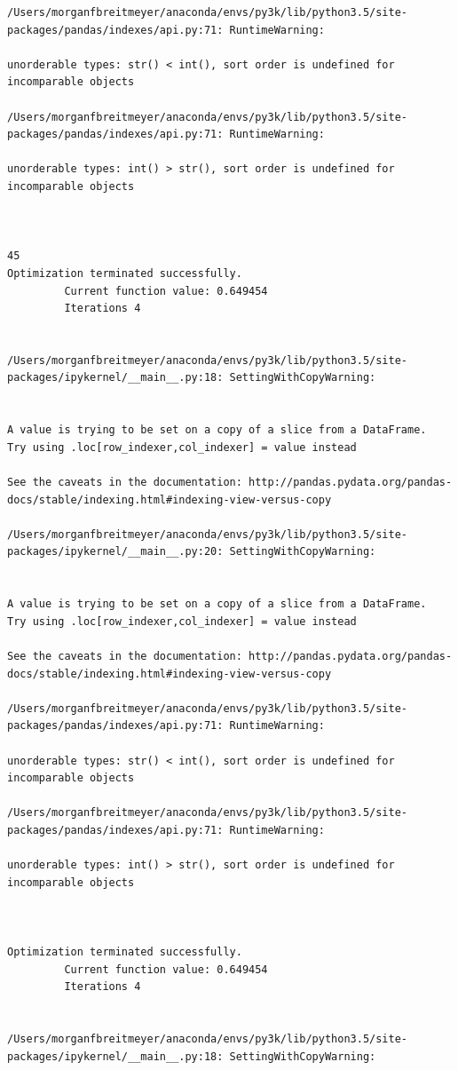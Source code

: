 \begin{lstlisting}
/Users/morganfbreitmeyer/anaconda/envs/py3k/lib/python3.5/site-packages/pandas/indexes/api.py:71: RuntimeWarning:

unorderable types: str() < int(), sort order is undefined for incomparable objects

/Users/morganfbreitmeyer/anaconda/envs/py3k/lib/python3.5/site-packages/pandas/indexes/api.py:71: RuntimeWarning:

unorderable types: int() > str(), sort order is undefined for incomparable objects



45
Optimization terminated successfully.
         Current function value: 0.649454
         Iterations 4


/Users/morganfbreitmeyer/anaconda/envs/py3k/lib/python3.5/site-packages/ipykernel/__main__.py:18: SettingWithCopyWarning:


A value is trying to be set on a copy of a slice from a DataFrame.
Try using .loc[row_indexer,col_indexer] = value instead

See the caveats in the documentation: http://pandas.pydata.org/pandas-docs/stable/indexing.html#indexing-view-versus-copy

/Users/morganfbreitmeyer/anaconda/envs/py3k/lib/python3.5/site-packages/ipykernel/__main__.py:20: SettingWithCopyWarning:


A value is trying to be set on a copy of a slice from a DataFrame.
Try using .loc[row_indexer,col_indexer] = value instead

See the caveats in the documentation: http://pandas.pydata.org/pandas-docs/stable/indexing.html#indexing-view-versus-copy

/Users/morganfbreitmeyer/anaconda/envs/py3k/lib/python3.5/site-packages/pandas/indexes/api.py:71: RuntimeWarning:

unorderable types: str() < int(), sort order is undefined for incomparable objects

/Users/morganfbreitmeyer/anaconda/envs/py3k/lib/python3.5/site-packages/pandas/indexes/api.py:71: RuntimeWarning:

unorderable types: int() > str(), sort order is undefined for incomparable objects



Optimization terminated successfully.
         Current function value: 0.649454
         Iterations 4


/Users/morganfbreitmeyer/anaconda/envs/py3k/lib/python3.5/site-packages/ipykernel/__main__.py:18: SettingWithCopyWarning:



\end{lstlisting}
